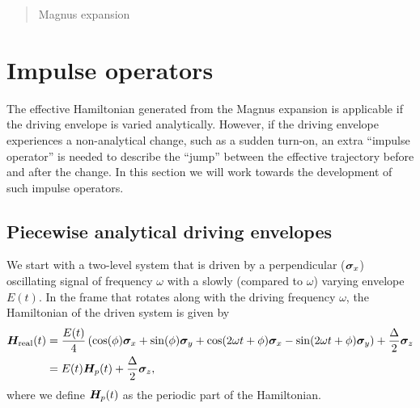 \maketitle %
\thispagestyle{firststyle} %


\vspace{1em}
\begin{abstract}
\noindent  
Magnus expansion
	
\end{abstract}
\newpage

\tableofcontents





\newpage

\section{Impulse operators}
The effective Hamiltonian generated from the Magnus expansion is applicable if the driving envelope is varied analytically. However, if the driving envelope experiences a non-analytical change, such as a sudden turn-on, an extra ``impulse operator'' is needed to describe the ``jump'' between the effective trajectory before and after the change. In this section we will work towards the development of such impulse operators.

\subsection{Piecewise analytical driving envelopes}
We start with a two-level system that is driven by a perpendicular ($\bm{\sigma}_x$) oscillating signal of frequency $\omega$ with a slowly (compared to $\omega$) varying envelope $E(t)$. In the frame that rotates along with the driving frequency $\omega$, the Hamiltonian of the driven system is given by 
\begin{align}
	\label{eq:H-drive-split}
	\bm{H}_{\text{real}}(t) &= \frac{E(t)}{4}\left( \cos(\phi) \bm{\sigma}_x + \sin(\phi)\bm{\sigma}_y + \cos(2 \omega t + \phi) \bm{\sigma}_x - \sin(2 \omega t + \phi) \bm{\sigma}_y \right) + \frac{\Delta}{2} \bm{\sigma}_z \nonumber \\ 
	&= E(t)\bm{H}_p(t) + \frac{\Delta}{2}\bm{\sigma}_z,
\end{align}
where we define $\bm{H}_p(t)$ as the periodic part of the Hamiltonian.

